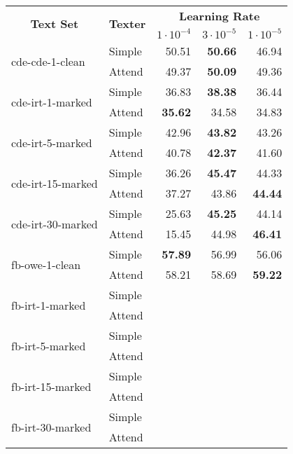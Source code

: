 \begin{tabular}{| l | l | r | r | r |}
    \hline

    \multicolumn{1}{|c|}{\multirow{2}{*}{\textbf{Text Set}}} &
    \multicolumn{1}{|c|}{\multirow{2}{*}{\textbf{Texter}}} &
    \multicolumn{3}{|c|}{\textbf{Learning Rate}} \\

    &
    &
    \multicolumn{1}{|c|}{\textbf{$1 \cdot 10^{-4}$}} &
    \multicolumn{1}{|c|}{\textbf{$3 \cdot 10^{-5}$}} &
    \multicolumn{1}{|c|}{\textbf{$1 \cdot 10^{-5}$}} \\

    \hline \hline

    \multirow{2}{*}{cde-cde-1-clean}
    & Simple & 50.51 & \textbf{50.66} & 46.94 \\
    & Attend & 49.37 & \textbf{50.09} & 49.36 \\ \hline

    \multirow{2}{*}{cde-irt-1-marked}
    & Simple & 36.83 & \textbf{38.38} & 36.44 \\
    & Attend & \textbf{35.62} & 34.58 & 34.83 \\ \hline

    \multirow{2}{*}{cde-irt-5-marked}
    & Simple & 42.96 & \textbf{43.82} & 43.26 \\
    & Attend & 40.78 & \textbf{42.37} & 41.60 \\ \hline

    \multirow{2}{*}{cde-irt-15-marked}
    & Simple & 36.26 & \textbf{45.47} & 44.33 \\
    & Attend & 37.27 & 43.86 & \textbf{44.44} \\ \hline

    \multirow{2}{*}{cde-irt-30-marked}
    & Simple & 25.63 & \textbf{45.25} & 44.14 \\
    & Attend & 15.45 & 44.98 & \textbf{46.41} \\ \hline \hline

    \multirow{2}{*}{fb-owe-1-clean}
    & Simple & \textbf{57.89} & 56.99 & 56.06 \\
    & Attend & 58.21 & 58.69 & \textbf{59.22} \\ \hline

    \multirow{2}{*}{fb-irt-1-marked}
    & Simple &  &  &  \\
    & Attend &  &  &  \\ \hline

    \multirow{2}{*}{fb-irt-5-marked}
    & Simple &  &  &  \\
    & Attend &  &  &  \\ \hline

    \multirow{2}{*}{fb-irt-15-marked}
    & Simple &  &  &  \\
    & Attend &  &  &  \\ \hline

    \multirow{2}{*}{fb-irt-30-marked}
    & Simple &  &  &  \\
    & Attend &  &  &  \\ \hline

\end{tabular}
